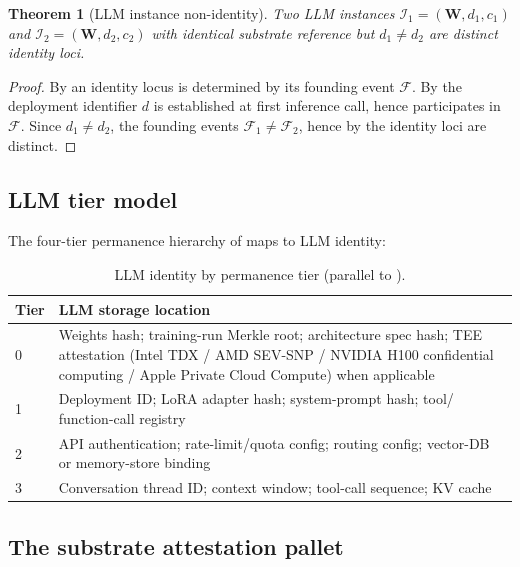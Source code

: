 \documentclass[11pt,a4paper,parskip=half-,DIV=12,headings=standardclasses]{scrartcl}
\theoremstyle{ncthm}
\newtheorem{theorem}{Theorem}[section]
\theoremstyle{ncdef}
\newcommand{\identity}{\mathcal{I}}
\newcommand{\founding}{\mathcal{F}}
\begin{document}
\begin{theorem}[LLM instance non-identity]\label{thm:llm-non-identity}
Two LLM instances $\identity_1 = (\mathbf{W}, d_1, c_1)$ and
$\identity_2 = (\mathbf{W}, d_2, c_2)$ with identical substrate
reference but $d_1 \neq d_2$ are distinct identity loci.
\end{theorem}

\begin{proof}
By  an identity locus is determined by its
founding event $\founding$. By  the
deployment identifier $d$ is established at first inference call, hence
participates in $\founding$. Since $d_1 \neq d_2$, the founding events
$\founding_1 \neq \founding_2$, hence by
 the identity loci are distinct.
\end{proof}

\subsection{LLM tier model}

The four-tier permanence hierarchy of  maps
to LLM identity:

\begin{table}[h]
\centering
\small
\begin{tabular}{@{}lp{10cm}@{}}
\toprule
\textsf{Tier} & \textsf{LLM storage location}\\
\midrule
0 & Weights hash; training-run Merkle root; architecture spec hash;
    TEE attestation (Intel TDX / AMD SEV-SNP / NVIDIA H100 confidential
    computing / Apple Private Cloud Compute) when applicable\\
1 & Deployment ID; LoRA adapter hash; system-prompt hash; tool/
    function-call registry\\
2 & API authentication; rate-limit/quota config; routing config;
    vector-DB or memory-store binding\\
3 & Conversation thread ID; context window; tool-call sequence; KV
    cache\\
\bottomrule
\end{tabular}
\caption{LLM identity by permanence tier (parallel to
).}
\label{tab:llm-tiers}
\end{table}

\subsection{The substrate attestation pallet}
\end{document}
